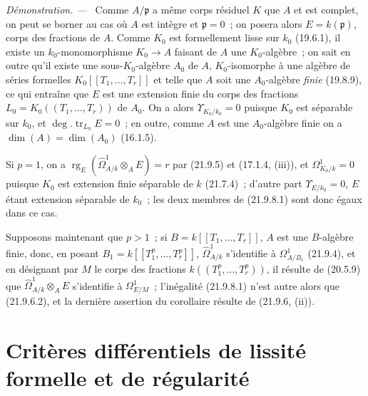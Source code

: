\documentclass[10pt,oneside]{book}
\newenvironment{proof}{%
  \par\medskip\noindent\textit{Démonstration. ---\ }}{\par}
\begin{document}
\begin{proof}
Comme $A/\mathfrak p$ a même corps résiduel $K$ que $A$ et est complet, on
peut se borner au cas où $A$ est intègre et $\mathfrak p=0$~; on posera
alors $E=k(\mathfrak p)$, corps des fractions de $A$. Comme $K_0$ est
formellement lisse sur $k_0$ (19.6.1), il existe un $k_0$-monomorphisme
$K_0\to A$ faisant de $A$ une $K_0$-algèbre~; on sait en outre qu'il existe
une sous-$K_0$-algèbre $A_0$ de $A$, $K_0$-isomorphe à une algèbre de séries
formelles $K_0[[T_1,\ldots,T_r]]$ et telle que $A$ soit une $A_0$-algèbre
\emph{finie} (19.8.9), ce qui entraîne que $E$ est une extension finie du
corps des fractions $L_0=K_0((T_1,\ldots,T_r))$ de $A_0$. On a alors
$\Upsilon_{K_0/k_0}=0$ puisque $K_0$ est séparable sur $k_0$, et
$\deg.\operatorname{tr}_{L_0}E=0$~; en outre, comme $A$ est une
$A_0$-algèbre finie on a $\dim(A)=\dim(A_0)$ (16.1.5).

Si $p=1$, on a
$\operatorname{rg}_E(\widehat\Omega^1_{A/k}\otimes_AE)=r$ par (21.9.5) et
(17.1.4, (iii)), et $\Omega^1_{K_0/k}=0$ puisque $K_0$ est extension finie
séparable de $k$ (21.7.4)~; d'autre part $\Upsilon_{E/k_0}=0$, $E$ étant
extension séparable de $k_0$~; les deux membres de (21.9.8.1) sont donc égaux
dans ce cas.

Supposons maintenant que $p>1$~; si $B=k[[T_1,\ldots,T_r]]$, $A$ est une
$B$-algèbre finie, donc, en posant $B_1=k[[T_1^p,\ldots,T_r^p]]$,
$\widehat\Omega^1_{A/k}$ s'identifie à $\Omega^1_{A/B_1}$ (21.9.4), et en
désignant par $M$ le corps des fractions $k((T_1^p,\ldots,T_r^p))$, il
résulte de (20.5.9) que $\widehat\Omega^1_{A/k}\otimes_AE$ s'identifie à
$\Omega^1_{E/M}$~; l'inégalité (21.9.8.1) n'est autre alors que (21.9.6.2),
et la dernière assertion du corollaire résulte de (21.9.6, (ii)).
\end{proof}


%
\section{Critères différentiels de lissité formelle et de régularité}
\label{section:0.22-fr}
\end{document}

